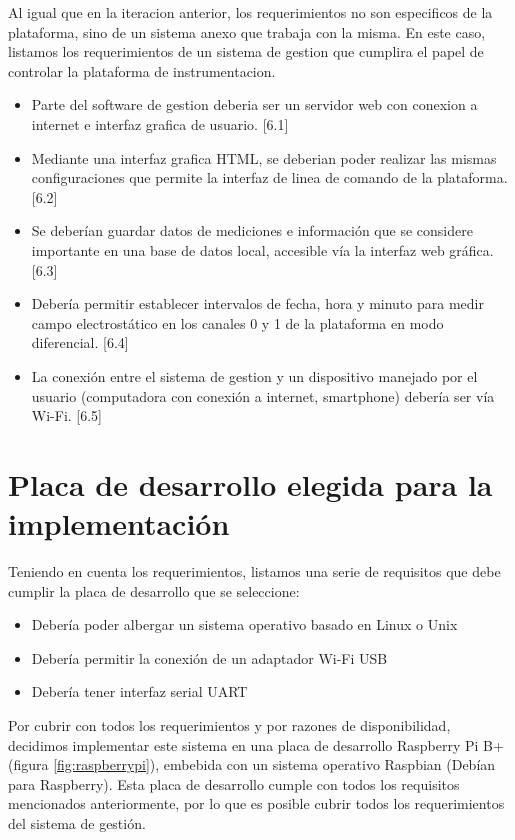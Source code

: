 Al igual que en la iteracion anterior, los requerimientos no son especificos de la plataforma, sino de un sistema anexo que trabaja con la misma. En este caso, listamos los requerimientos de un sistema de gestion que cumplira el papel de controlar la plataforma de instrumentacion.

\begin{itemize}
\item Parte del software de gestion deberia ser un servidor web con conexion a internet e interfaz grafica de usuario. [6.1]
\item Mediante una interfaz grafica HTML, se deberian poder realizar las mismas configuraciones que permite la interfaz de linea de comando de la plataforma. [6.2]
\item Se deberían guardar datos de mediciones e información que se considere importante en una base de datos local, accesible vía la interfaz web gráfica. [6.3]
\item Debería permitir establecer intervalos de fecha, hora y minuto para medir campo electrostático en los canales 0 y 1 de la plataforma en modo diferencial. [6.4]
\item La conexión entre el sistema de gestion y un dispositivo manejado por el usuario (computadora con conexión a internet, smartphone) debería ser vía Wi-Fi. [6.5]
\end{itemize}



\section{Placa de desarrollo elegida para la implementación} %
\label{it7:sec:placa_de_desarrollo_elegida_para_la_implementacion}

Teniendo en cuenta los requerimientos, listamos una serie de requisitos que debe cumplir la placa de desarrollo que se seleccione:

\begin{itemize}
  \item Debería poder albergar un sistema operativo basado en Linux o Unix
  \item Debería permitir la conexión de un adaptador Wi-Fi USB
  \item Debería tener interfaz serial UART
\end{itemize}

Por cubrir con todos los requerimientos y por razones de disponibilidad, decidimos implementar este sistema en una placa de desarrollo Raspberry Pi B+ (figura \ref{fig:raspberrypi}), embebida con un sistema operativo Raspbian (Debían para Raspberry). Esta placa de desarrollo cumple con todos los requisitos mencionados anteriormente, por lo que es posible cubrir todos los requerimientos del sistema de gestión.

